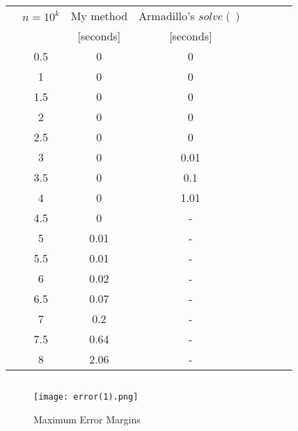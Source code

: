 \documentclass[10pt, conference, compsocconf]{IEEEtran}
\begin{document}
\begin{tabular}{l*{6}{c}r}
              & $n=10^{k}$ & My method & Armadillo's $solve()$ & \\
&  & [seconds]    & [seconds] & \\

\hline
& 0.5 & 0    & 0 & \\
& 1   & 0    & 0 & \\
& 1.5 & 0    & 0 & \\
& 2   & 0    & 0 & \\
& 2.5 & 0    & 0 & \\
& 3   & 0    & 0.01 & \\
& 3.5 & 0    & 0.1 & \\
& 4   & 0    & 1.01 & \\
& 4.5 & 0    & - & \\
& 5   & 0.01 & - & \\
& 5.5 & 0.01 & - & \\
& 6   & 0.02 & - & \\
& 6.5 & 0.07 & - & \\
& 7   & 0.2  & - & \\
& 7.5 & 0.64 & - & \\
& 8   & 2.06 & - & \\
\end{tabular}


\newpage
$ $ 
\newpage

\begin{figure}[t]
\caption{Maximum Error Margins}
  \centering
    \texttt{[image: error(1).png]}
\end{figure}
\end{document}
